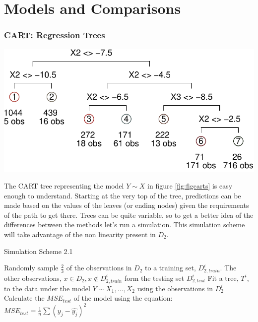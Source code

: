 \documentclass[12pt,twoside]{reedthesis}
\let\origfigure\figure
\let\endorigfigure\endfigure
\renewenvironment{figure}[1][2] {
    \expandafter\origfigure\expandafter[H]
} {
    \endorigfigure
}
\begin{document}
  \section{Models and Comparisons}\label{models-and-comparisons}
  
  \subsubsection{CART: Regression Trees}\label{cart-regression-trees}
  
  \begin{figure}[htbp]
  \centering
  \includegraphics{Thesis_files/figure-latex/unnamed-chunk-19-1.pdf}
  \caption{\label{fig:unnamed-chunk-19}\label{fig:figcarts}CART representing
  Y\textasciitilde{} X, from D2}
  \end{figure}
  
  The CART tree representing the model \(Y \sim X\) in figure
  \ref{fig:figcarts} is easy enough to understand. Starting at the very
  top of the tree, predictions can be made based on the values of the
  leaves (or ending nodes) given the requirements of the path to get
  there. Trees can be quite variable, so to get a better idea of the
  differences between the methods let's run a simulation. This simulation
  scheme will take advantage of the non linearity present in \(D_2\).
  
  \begin{algorithm}
  \caption{Simulation Scheme 2.1}
  \label{sim2.1}
  \begin{algorithmic}[1]
  \State Randomly sample $\frac 2 3$  of the observations in  $D_2$  to a training set,  $D_{2, train}^i$. The other observations,  $x \in D_2, x \notin D_{2, train}^i$ form the testing set $D_{2, test}^i$
  \State Fit a tree, $T^i$, to the data under the model $Y \sim X_1,...,X_2$ using the observations in $D_{2}^i$
  \State Calculate the $MSE_{test}$ of the model using the equation:
      $MSE_{test} = \frac 1 n \sum (y_j - \hat{y_j})^2$
  \EndFor
  \end{algorithmic}
  \end{algorithm}
  
\end{document}
